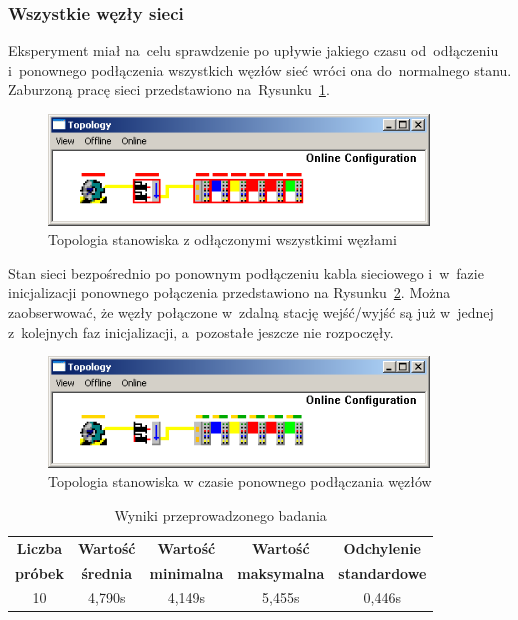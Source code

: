 \subsubsection{Wszystkie węzły sieci}
\label{badania:cala_siec}
Eksperyment miał na~celu sprawdzenie po upływie jakiego czasu od~odłączeniu i~ponownego podłączenia wszystkich węzłów sieć wróci ona do~normalnego stanu. Zaburzoną pracę sieci przedstawiono na~Rysunku~\ref{topologyCPallerror}.
\begin{figure}[!htb] 	\centering 	\includegraphics[width=0.9\textwidth]{images/topologyCPallerror} \caption{Topologia stanowiska z odłączonymi wszystkimi węzłami} \label{topologyCPallerror} \end{figure}

\noindent Stan sieci bezpośrednio po ponownym podłączeniu kabla sieciowego i~w~fazie inicjalizacji ponownego połączenia przedstawiono na Rysunku~\ref{topologyCPallloading}. Można zaobserwować, że węzły połączone w~zdalną stację wejść/wyjść są już w~jednej z~kolejnych faz inicjalizacji, a~pozostałe jeszcze nie rozpoczęły.
\begin{figure}[!htb] 	\centering 	\includegraphics[width=0.9\textwidth]{images/topologyCPallloading} \caption{Topologia stanowiska w czasie ponownego podłączania węzłów} \label{topologyCPallloading} \end{figure}

\begin{table}[!htb]
\begin{center}
\begin{tabular}{| c | c | c | c | c |}\hline
\textbf{Liczba} & \textbf{Wartość} & \textbf{Wartość} & \textbf{Wartość} & \textbf{Odchylenie} \\
\textbf{próbek} & \textbf{średnia} & \textbf{minimalna} & \textbf{maksymalna} & \textbf{standardowe} \\\hline\hline
10 & 4,790s & 4,149s & 5,455s & 0,446s\\\hline
\end{tabular}
\end{center}
\vspace*{-6mm}
  \caption{Wyniki przeprowadzonego badania}
	\label{badania:wyniki:stabilizacja_siec}
\end{table}

